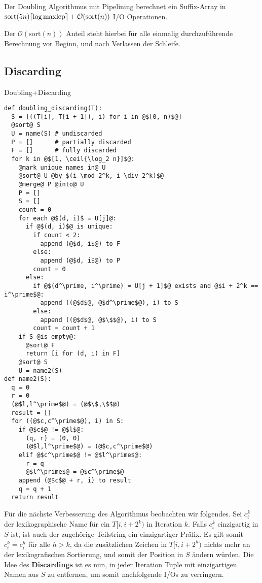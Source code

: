 \begin{theorem}
Der Doubling Algorithmus mit Pipelining berechnet ein Suffix-Array in\\ $\text{sort}(5n) \ceil*{\log \text{maxlcp}} +  \mathcal{O}(\text{sort}(n))$ I/O Operationen.
\end{theorem}

Der $\mathcal{O}(\text{sort}(n))$ Anteil steht hierbei für alle einmalig durchzuführende Berechnung vor Beginn, und nach Verlassen der Schleife.

\subsection{Discarding}
\label{algo:doubling:sec:discarding}

\begin{listing}[htp]
\caption{Doubling+Discarding} 
\label{algo:doubling:code:discarding}
\begin{verbatim}
def doubling_discarding(T):
  S = [((T[i], T[i + 1]), i) for i in @$[0, n)$@]
  @sort@ S
  U = name(S) # undiscarded
  P = []      # partially discarded
  F = []      # fully discarded
  for k in @$[1, \ceil{\log_2 n}]$@:
    @mark unique names in@ U
    @sort@ U @by $(i \mod 2^k, i \div 2^k)$@
    @merge@ P @into@ U
    P = []
    S = []
    count = 0
    for each @$(d, i)$ = U[j]@:
      if @$(d, i)$@ is unique:
        if count < 2:
          append (@$d, i$@) to F
        else:
          append (@$d, i$@) to P
        count = 0
      else:
        if @$(d^\prime, i^\prime) = U[j + 1]$@ exists and @$i + 2^k == i^\prime$@:
          append ((@$d$@, @$d^\prime$@), i) to S
        else:
          append ((@$d$@, @$\$$@), i) to S
        count = count + 1
    if S @is empty@:
      @sort@ F
      return [i for (d, i) in F]
    @sort@ S
    U = name2(S)
def name2(S):
  q = 0
  r = 0
  (@$l,l^\prime$@) = (@$\$,\$$@)
  result = []
  for ((@$c,c^\prime$@), i) in S:
    if @$c$@ != @$l$@:
      (q, r) = (0, 0)
      (@$l,l^\prime$@) = (@$c,c^\prime$@)
    elif @$c^\prime$@ != @$l^\prime$@:
      r = q
      @$l^\prime$@ = @$c^\prime$@
    append (@$c$@ + r, i) to result
    q = q + 1
  return result
\end{verbatim}
\end{listing}

Für die nächste Verbesserung des Algorithmus beobachten wir folgendes. Sei $c_i^k$ der lexikographische Name für ein $T[i, i + 2^k)$ in Iteration $k$. Falls $c_i^k$ einzigartig in $S$ ist, ist auch der zugehörige Teilstring ein einzigartiger Präfix. Es gilt somit $c_i^k = c_i^h$ für alle $h > k$, da die zusätzlichen Zeichen in $T[i, i + 2^h)$ nichts mehr an der lexikografischen Sortierung, und somit der Position in $S$ ändern würden. Die Idee des \textbf{Discardings} ist es nun, in jeder Iteration Tuple mit einzigartigen Namen aus $S$ zu entfernen, um somit nachfolgende I/Os zu verringern. 

